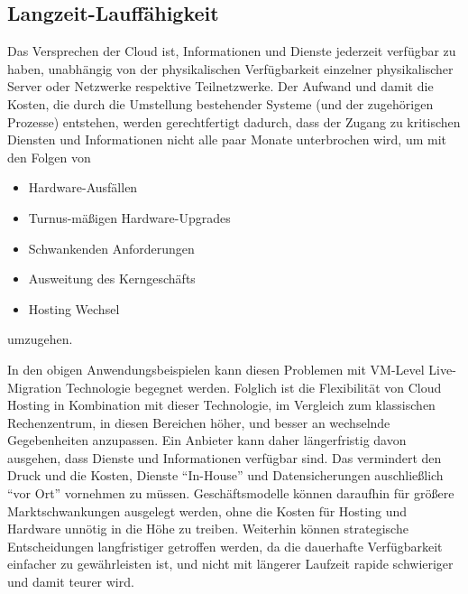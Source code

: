 \subsection{Langzeit-Lauffähigkeit}
\label{sec:langz-lauff}
Das Versprechen der Cloud ist, Informationen und Dienste jederzeit
verfügbar zu haben, unabhängig von der physikalischen Verfügbarkeit
einzelner physikalischer Server oder Netzwerke respektive
Teilnetzwerke. Der Aufwand und damit die Kosten, die durch die
Umstellung bestehender Systeme (und der zugehörigen Prozesse)
entstehen, werden gerechtfertigt dadurch, dass der Zugang zu
kritischen Diensten und Informationen nicht alle paar Monate
unterbrochen wird, um mit den Folgen von
\begin{itemize}
\item Hardware-Ausfällen
\item Turnus-mäßigen Hardware-Upgrades
\item Schwankenden Anforderungen
\item Ausweitung des Kerngeschäfts
\item Hosting Wechsel
\end{itemize}
umzugehen.

In den obigen Anwendungsbeispielen kann diesen Problemen mit VM-Level
Live-Migration Technologie begegnet werden. Folglich ist die
Flexibilität von Cloud Hosting in Kombination mit dieser Technologie,
im Vergleich zum klassischen Rechenzentrum, in diesen Bereichen höher,
und besser an wechselnde Gegebenheiten anzupassen. Ein Anbieter kann
daher längerfristig davon ausgehen, dass Dienste und Informationen
verfügbar sind. Das vermindert den Druck und die Kosten, Dienste
"`In-House"' und Datensicherungen auschließlich "`vor Ort"' vornehmen
zu müssen. Geschäftsmodelle können daraufhin für größere
Marktschwankungen ausgelegt werden, ohne die Kosten für Hosting und
Hardware unnötig in die Höhe zu treiben. Weiterhin können strategische
Entscheidungen langfristiger getroffen werden, da die dauerhafte
Verfügbarkeit einfacher zu gewährleisten ist, und nicht mit längerer
Laufzeit rapide schwieriger und damit teurer wird.


